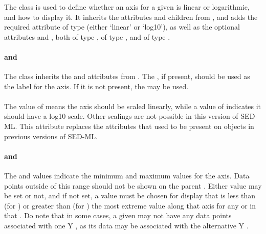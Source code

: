 \subsubsection{}
\label{class:axis}
The \Axis class is used to define whether an axis for a given \Plot is linear or logarithmic, and how to display it.  It inherits the attributes and children from \SedBase, and adds the required attribute  of type \AxisType (either `linear' or `log10'), as well as the optional attributes  and , both of type ,  of type , and  of type \SIdRef.

\begin{blockChanged}
\paragraph*{ and }
The \Axis class inherits the  and  attributes from \SedBase.  The , if present, should be used as the label for the axis.  If it is not present, the  may be used.


\paragraph*{}
The  value of  means the axis should be scaled linearly, while a value of  indicates it should have a log10 scale.  Other scalings are not possible in this version of SED-ML.  This attribute replaces the  attributes that used to be present on \Curve objects in previous versions of SED-ML. 

\paragraph*{ and }
The  and  values indicate the minimum and maximum values for the axis.  Data points outside of this range should not be shown on the parent \Plot.  Either value may be set or not, and if not set, a value must be chosen for display that is less than (for ) or greater than (for ) the most extreme value along that axis for any \Curve or \Surface in that \Plot.  Do note that in some cases, a given \Curve may not have any data points associated with one Y \Axis, as its data may be associated with the alternative Y \Axis.


\end{blockChanged}
